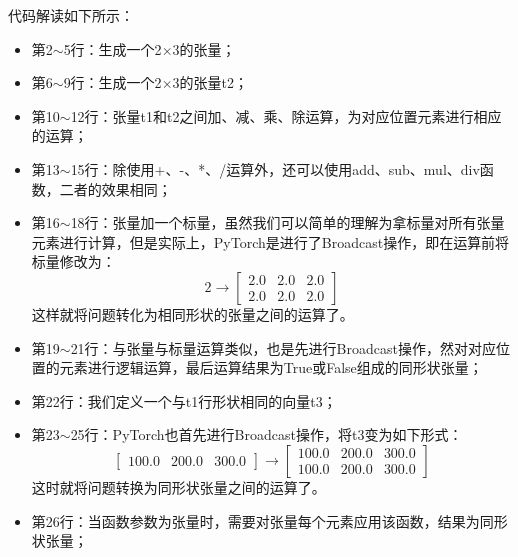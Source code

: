 \documentclass[UTF8]{article}
\begin{document}
代码解读如下所示：
\begin{itemize}
\item 第2$\sim$5行：生成一个2$\times$3的张量；
\item 第6$\sim$9行：生成一个2$\times$3的张量t2；
\item 第10$\sim$12行：张量t1和t2之间加、减、乘、除运算，为对应位置元素进行相应的运算；
\item 第13$\sim$15行：除使用+、-、*、/运算外，还可以使用add、sub、mul、div函数，二者的效果相同；
\item 第16$\sim$18行：张量加一个标量，虽然我们可以简单的理解为拿标量对所有张量元素进行计算，但是实际上，PyTorch是进行了Broadcast操作，即在运算前将标量修改为：
\begin{equation}
2 \to \begin{bmatrix}
2.0 & 2.0 & 2.0 \\
2.0 & 2.0 & 2.0
\end{bmatrix}
\label{tensor-scala-broadcast-scala}
\end{equation}
这样就将问题转化为相同形状的张量之间的运算了。
\item 第19$\sim$21行：与张量与标量运算类似，也是先进行Broadcast操作，然对对应位置的元素进行逻辑运算，最后运算结果为True或False组成的同形状张量；
\item 第22行：我们定义一个与t1行形状相同的向量t3；
\item 第23$\sim$25行：PyTorch也首先进行Broadcast操作，将t3变为如下形式：
\begin{equation}
\begin{bmatrix}
100.0 & 200.0 & 300.0
\end{bmatrix} \to \begin{bmatrix}
100.0 & 200.0 & 300.0 \\
100.0 & 200.0 & 300.0
\end{bmatrix}
\label{tensor-scala-broadcast-tensor}
\end{equation}
这时就将问题转换为同形状张量之间的运算了。
\item 第26行：当函数参数为张量时，需要对张量每个元素应用该函数，结果为同形状张量；
\end{itemize}
\end{document}
